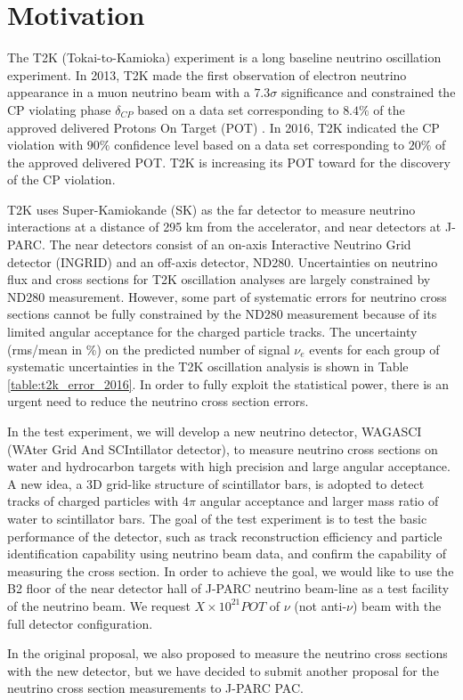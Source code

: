 \section{Motivation}
The T2K (Tokai-to-Kamioka) experiment is a long baseline neutrino oscillation experiment.
In 2013, T2K made the first observation of electron neutrino appearance in a muon neutrino beam
with a $7.3\sigma$ significance and constrained the CP violating phase $\delta_{CP}$ based on
a data set corresponding to $8.4\%$ of the approved delivered Protons On Target (POT) \cite{t2k_nue_appearance_2013}.
In 2016, T2K indicated the CP violation with $90\%$ confidence level based on
a data set corresponding to $20\%$ of the approved delivered POT\cite{t2k_cp_2016}.
T2K is increasing its POT toward for the discovery of the CP violation.


T2K uses Super-Kamiokande (SK) as the far detector to measure neutrino interactions
at a distance of 295 km from the accelerator, and near detectors at J-PARC.
The near detectors consist of an on-axis Interactive Neutrino Grid detector (INGRID)
and an off-axis detector, ND280.
Uncertainties on neutrino flux and cross sections for T2K oscillation analyses are largely constrained
by ND280 measurement.
However, some part of systematic errors for neutrino cross sections cannot be fully constrained by the ND280 measurement because of its limited angular acceptance for the charged particle tracks.
The uncertainty (rms/mean in \%) on the predicted number of signal $\nu_{e}$ events for each group
of systematic uncertainties in the T2K oscillation analysis \cite{t2K_cp_2016} is shown in Table \ref{table:t2k_error_2016}.
In order to fully exploit the statistical power, there is an urgent need to reduce the neutrino cross section errors.


In the test experiment, we will develop a new neutrino detector, WAGASCI (WAter Grid And SCIntillator detector), to measure neutrino cross sections
on water and hydrocarbon targets with high precision and large angular acceptance.
A new idea, a 3D grid-like structure of scintillator bars, is adopted to detect tracks of charged particles
with $4\pi$ angular acceptance and larger mass ratio of water to scintillator bars.
The goal of the test experiment is to test the basic performance of the detector,
such as track reconstruction efficiency and particle identification capability using neutrino beam data,
and confirm the capability of measuring the cross section.
In order to achieve the goal, we would like to use the B2 floor of the near detector hall of J-PARC neutrino beam-line as a test facility of the neutrino beam.
We request $X \times 10^{21} POT$ of $\nu$ (not anti-$\nu$) beam with the full detector configuration.


In the original proposal, we also proposed to measure the neutrino cross sections with
the new detector, but we have decided to submit another proposal for the neutrino cross section
measurements to J-PARC PAC.
